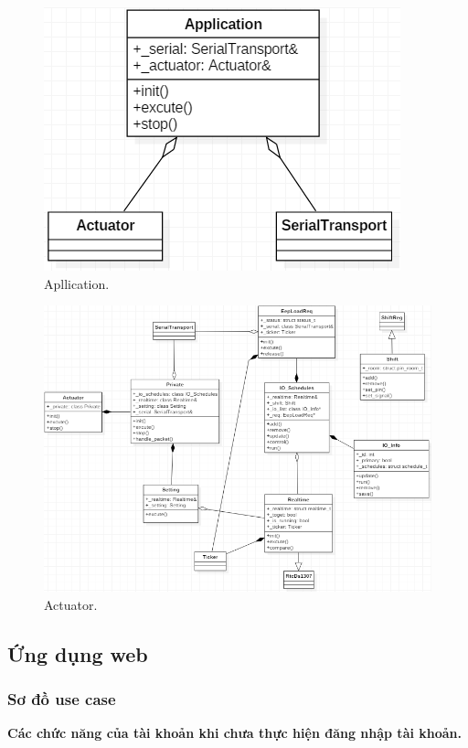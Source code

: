 \documentclass[a4paper,12pt,oneside]{article}
\begin{document}
\begin{itemize}
\begin{itemize}
\begin{figure}[H]
\centering
\includegraphics[scale=.85]{hinh/class_stmapplication.PNG}
\caption{Apllication.}
\end{figure}

\begin{figure}[H]
\centering
\includegraphics[scale=.75]{hinh/class_actuator.PNG}
\caption{Actuator.}
\end{figure}

\end{itemize}

\end{itemize}
\newpage
\subsection{Ứng dụng web}
\subsubsection{Sơ đồ use case}
\indent \textbf{Các chức năng của tài khoản khi chưa thực hiện đăng nhập tài khoản.}\\
\end{document}
